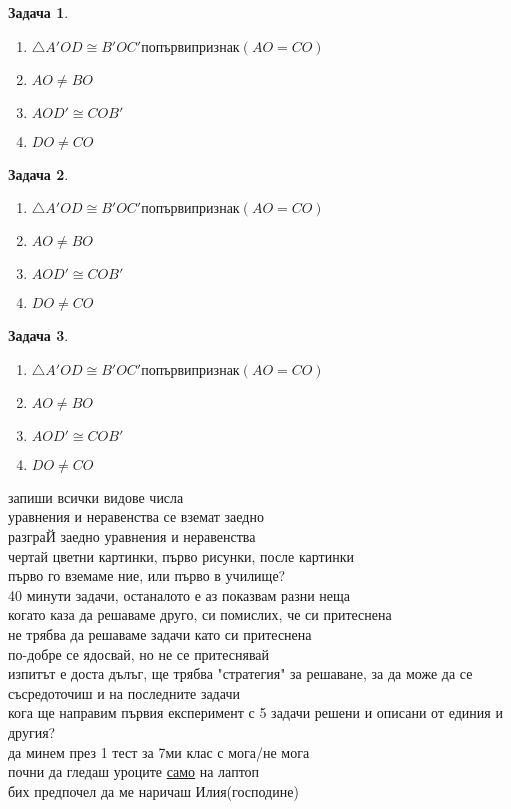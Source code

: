 \documentclass{article}
\newtheorem{problem}{Задача}
\begin{document}
\begin{problem}
	\begin{enumerate}
		\item 	$\triangle A'OD \cong B'OC' по първи признак(AO =CO ) $
		\item $AO \neq BO$ 
		\item $AOD' \cong COB'$
		\item $DO \neq CO$
	\end{enumerate}

\end{problem}


\begin{problem}
	\begin{enumerate}
		\item 	$\triangle A'OD \cong B'OC' по първи признак(AO =CO ) $
		\item $AO \neq BO$ 
		\item $AOD' \cong COB'$
		\item $DO \neq CO$
	\end{enumerate}
	
\end{problem}


\begin{problem}
	\begin{enumerate}
		\item 	$\triangle A'OD \cong B'OC' по първи признак(AO =CO ) $
		\item $AO \neq BO$ 
		\item $AOD' \cong COB'$
		\item $DO \neq CO$
	\end{enumerate}
	
\end{problem}
запиши всички видове числа \\
уравнения и неравенства се вземат заедно \\
разграЙ заедно уравнения и неравенства \\
чертай цветни картинки, първо рисунки, после картинки\\
първо го вземаме ние, или първо в училище?\\
40 минути задачи, останалото е аз показвам разни неща\\
когато каза да решаваме друго, си помислих, че си притеснена\\
не трябва да решаваме задачи като си притеснена\\
по-добре се ядосвай, но не се притеснявай\\
изпитът е доста дълъг, ще трябва "стратегия" за решаване, за да може да се съсредоточиш и на последните задачи \\
кога ще направим първия експеримент с 5 задачи решени и описани от единия и другия?\\
да минем през 1 тест за 7ми клас с мога/не мога \\
почни да гледаш уроците \underline{само} на лаптоп\\
бих предпочел да ме наричаш Илия(господине)\\
\end{document}
